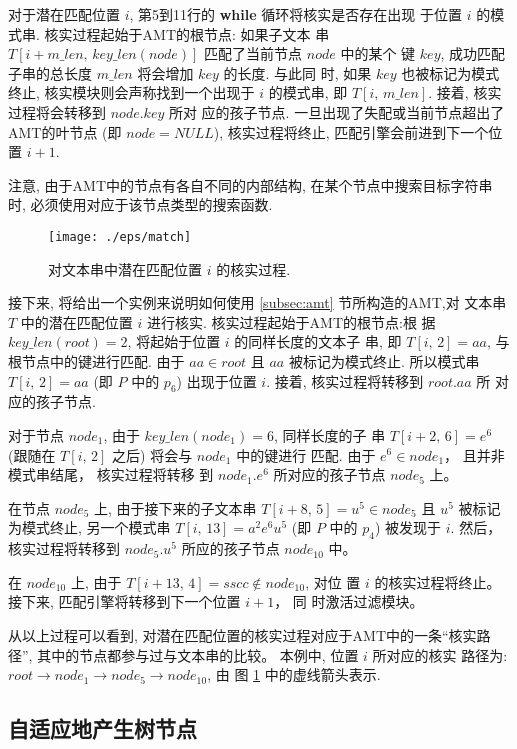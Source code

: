 \documentclass{ws-ijprai}
\begin{document}
对于潜在匹配位置 $i$, 第5到11行的 \textbf{while} 循环将核实是否存在出现
于位置 $i$ 的模式串. 核实过程起始于AMT的根节点: 如果子文本
串 $T[i+m\_len, \, key\_len(node)]$ 匹配了当前节点 $node$ 中的某个
键 $key$, 成功匹配子串的总长度 $m\_len$ 将会增加 $key$ 的长度. 与此同
时, 如果 $key$ 也被标记为模式终止, 核实模块则会声称找到一个出现于 $i$
的模式串, 即 $T[i,\,m\_len]$. 接着, 核实过程将会转移到 $node.key$ 所对
应的孩子节点. 一旦出现了失配或当前节点超出了AMT的叶节点 (即 $node =
NULL$), 核实过程将终止, 匹配引擎会前进到下一个位置 $i+1$.

注意, 由于AMT中的节点有各自不同的内部结构, 在某个节点中搜索目标字符串
时, 必须使用对应于该节点类型的搜索函数.

\begin{figure}[htbp]
  \centering
  \texttt{[image: ./eps/match]}
  \caption{对文本串中潜在匹配位置 $i$ 的核实过程.}
  \label{fig:matching}
\end{figure}

接下来, 将给出一个实例来说明如何使用 \ref{subsec:amt} 节所构造的AMT,对
文本串 $T$ 中的潜在匹配位置 $i$ 进行核实. 核实过程起始于AMT的根节点:根
据 $key\_len(root)=2$, 将起始于位置 $i$ 的同样长度的文本子
串, 即 $T[i,\,2]=aa$, 与根节点中的键进行匹配. 由于 $aa \in
root$ 且 $aa$ 被标记为模式终止. 所以模式串 $T[i,\,2]=aa$
(即 $P$ 中的 $p_6$) 出现于位置 $i$. 接着, 核实过程将转移到 $root.aa$ 所
对应的孩子节点.

对于节点 $node_1$, 由于 $key\_len(node_1)=6$, 同样长度的子
串 $T[i+2,\,6]=e^6$ (跟随在 $T[i,\,2]$ 之后) 将会与 $node_1$ 中的键进行
匹配. 由于 $e^6 \in node_1$， 且并非模式串结尾， 核实过程将转移
到 $node_1.e^6$ 所对应的孩子节点 $node_5$ 上。

在节点 $node_5$ 上, 由于接下来的子文本串 $T[i+8,\,5]=u^5 \in
node_5$ 且 $u^5$ 被标记为模式终止, 另一个模式串 $T[i,\,13]=a^2e^6u^5$
(即 $P$ 中的 $p_4$) 被发现于 $i$. 然后，核实过程将转移到 $node_5.u^5$
所应的孩子节点 $node_{10}$ 中。

在 $node_{10}$ 上, 由于 $T[i+13,\,4]=sscc \notin node_{10}$, 对位
置 $i$ 的核实过程将终止。 接下来, 匹配引擎将转移到下一个位置 $i+1$， 同
时激活过滤模块。

从以上过程可以看到, 对潜在匹配位置的核实过程对应于AMT中的一条“核实路
径”, 其中的节点都参与过与文本串的比较。 本例中, 位置 $i$ 所对应的核实
路径为:
$root \rightarrow node_1 \rightarrow node_5 \rightarrow node_{10}$, 由
图 \ref{fig:matching} 中的虚线箭头表示.


\subsection{自适应地产生树节点}
\label{subsec:nodes}
\end{document}
